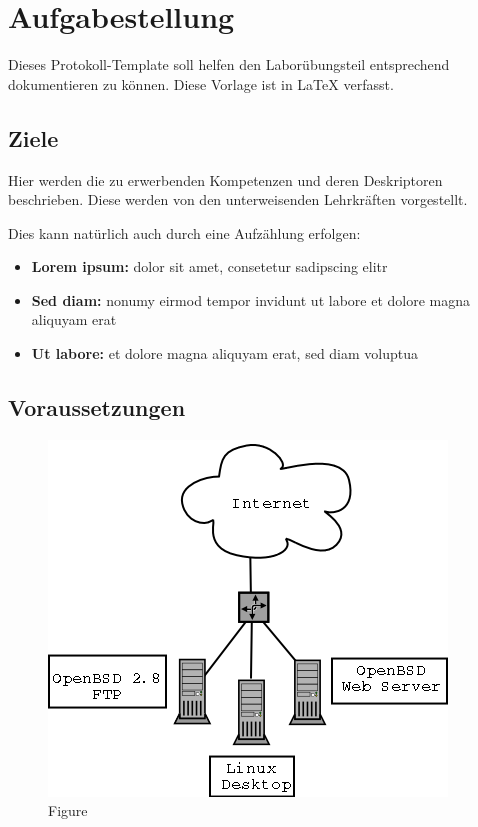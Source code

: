 
\section{Aufgabestellung}
Dieses Protokoll-Template soll helfen den Laborübungsteil entsprechend dokumentieren zu können.
Diese Vorlage ist in \LaTeX{}  verfasst.

\subsection{Ziele}
Hier werden die zu erwerbenden Kompetenzen und deren Deskriptoren beschrieben.
Diese werden von den unterweisenden Lehrkräften vorgestellt.

Dies kann natürlich auch durch eine Aufzählung erfolgen:

\begin{itemize}
	\item \textbf{Lorem ipsum:} dolor sit amet, consetetur sadipscing elitr
	\item \textbf{Sed diam:} nonumy eirmod tempor invidunt ut labore et dolore magna aliquyam erat
	\item \textbf{Ut labore:} et dolore magna aliquyam erat, sed diam voluptua
\end{itemize}


\subsection{Voraussetzungen}
\lipsum[4]

\begin{figure}[!h]
	\begin{center}
		\includegraphics[width=0.4\linewidth]{images/home_network.png}
		\caption{Figure \cite{example}}
		\label{broker}
	\end{center}
\end{figure}
